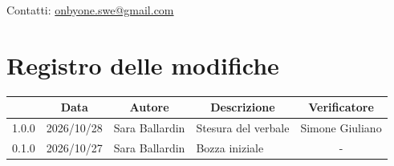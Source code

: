 \documentclass[11pt, a4paper]{article}
\begin{document}
\begin{titlepage}
    \vspace{0.5cm}
    
    {\large Contatti: \href{mailto:onbyone.swe@gmail.com}{onbyone.swe@gmail.com} }
    
\end{titlepage}

\newpage

\section*{Registro delle modifiche}

\vspace{1cm}
\begin{center}
    \renewcommand{\arraystretch}{1.5}
    \begin{tabularx}{\textwidth}{|c|c|c|X|c|}
        \hline
        \rowcolor{gray!10} 
        \multicolumn{1}{|c|}{\textbf{Versione}} & 
        \multicolumn{1}{c|}{\textbf{Data}} & 
        \multicolumn{1}{c|}{\textbf{Autore}} & 
        \multicolumn{1}{c|}{\textbf{Descrizione}} & 
        \multicolumn{1}{c|}{\textbf{Verificatore}} \\
        \hline
        1.0.0 & 2026/10/28 & Sara Ballardin & Stesura del verbale & Simone Giuliano \\
        \hline
        0.1.0 & 2026/10/27 & Sara Ballardin & Bozza iniziale & - \\
        \hline
    \end{tabularx}
\end{center}
\vfill
\newpage

\tableofcontents
\newpage

\end{document}

